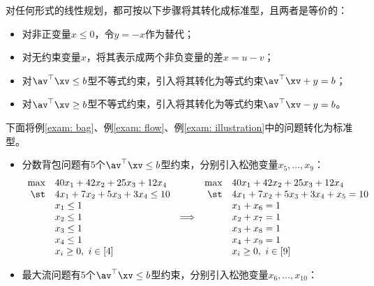 \documentclass{ctexart}
\begin{document}
对任何形式的线性规划，都可按以下步骤将其转化成标准型，且两者是等价的：
\begin{itemize}
    \item 对非正变量$x \le 0$，令$y = -x$作为替代；
    \item 对无约束变量$x$，将其表示成两个非负变量的差$x = u - v$；
    \item 对$\av^\top \xv \le b$型不等式约束，引入将其转化为等式约束$\av^\top \xv + y = b$；
    \item 对$\av^\top \xv \ge b$型不等式约束，引入将其转化为等式约束$\av^\top \xv - y = b$。
\end{itemize}

下面将例\ref{exam: bag}、例\ref{exam: flow}、例\ref{exam: illustration}中的问题转化为标准型。

\begin{itemize}
    \item 分数背包问题有$5$个$\av^\top \xv \le b$型约束，分别引入松弛变量$x_5, \ldots, x_9$：
          \begin{align}
              \begin{array}{rlcrl} \label{eq: bag-standard}
                  \max & 40 x_1 + 42 x_2 + 25 x_3 + 12 x_4    &                 & \max & 40 x_1 + 42 x_2 + 25 x_3 + 12 x_4        \\
                  \st  & 4 x_1 + 7 x_2 + 5 x_3 + 3 x_4 \le 10 &                 & \st  & 4 x_1 + 7 x_2 + 5 x_3 + 3 x_4 + x_5 = 10 \\
                       & x_1 \le 1                            &                 &      & x_1 + x_6 = 1                            \\
                       & x_2 \le 1                            & \Longrightarrow &      & x_2 + x_7 = 1                            \\
                       & x_3 \le 1                            &                 &      & x_3 + x_8 = 1                            \\
                       & x_4 \le 1                            &                 &      & x_4 + x_9 = 1                            \\
                       & x_i \ge 0, ~ i \in [4]               &                 &      & x_i \ge 0, ~ i \in [9]
              \end{array}
          \end{align}
    \item 最大流问题有$5$个$\av^\top \xv \le b$型约束，分别引入松弛变量$x_6, \ldots, x_{10}$：

\end{itemize}
\end{document}
